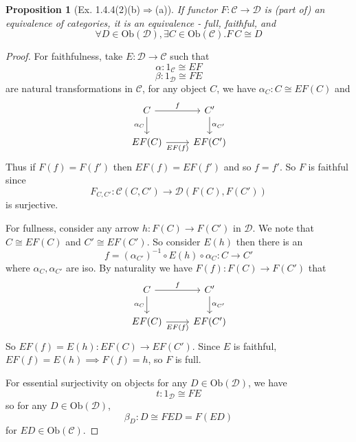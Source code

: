 \documentclass[11pt]{article} %
\newtheorem{proposition}[theorem]{Proposition}
\theoremstyle{definition}
\theoremstyle{definition}
\theoremstyle{definition}
\begin{document}
\begin{proposition}[Ex. 1.4.4(2)(b)$\Rightarrow$(a)]
    If functor $F:\mathcal{C}\rightarrow\mathcal{D}$ is (part of) an equivalence of categories,
    it is an equivalence - full, faithful, and 
    \[\forall D\in\text{Ob}(\mathcal{D}),\exists C\in\text{Ob}(\mathcal{C}). F\ C \cong D\]
\end{proposition}
\begin{proof}
For faithfulness, take $E:\mathcal{D}\rightarrow \mathcal{C}$ such that
\[\alpha : 1_{\mathcal{C}} \cong EF\]
\[\beta : 1_{\mathcal{D}} \cong FE\]
are natural transformations in $\mathcal{C}$, for any object $C$, we have $\alpha_C : C \cong EF(C)$ and
\[\begin{tikzcd}
	C & {C'} \\
	{EF(C)} & {EF(C')}
	\arrow["f", from=1-1, to=1-2]
	\arrow["{\alpha_C}"', from=1-1, to=2-1]
	\arrow["{EF(f)}"', from=2-1, to=2-2]
	\arrow["{\alpha_{C'}}", from=1-2, to=2-2]
\end{tikzcd}\]
Thus if $F(f)=F(f')$ then $EF(f)=EF(f')$ and so $f=f'$. So $F$ is faithful since
\[F_{C,C'}:\mathcal{C}(C,C')\rightarrow \mathcal{D}(F(C),F(C'))\]
is surjective.

For fullness, consider any arrow $h:F(C) \rightarrow F(C')$ in $\mathcal{D}$. 
We note that $C\cong EF(C)$ and $C'\cong EF(C')$. So consider $E(h)$ then there is an
\[f = (\alpha_{C'})^{-1} \circ E(h) \circ \alpha_C : C\rightarrow C'\]
where $\alpha_C,\alpha_{C'}$ are iso. By naturality we have $F(f):F(C)\rightarrow F(C')$ that
\[\begin{tikzcd}
	C & {C'} \\
	{EF(C)} & {EF(C')}
	\arrow["f", from=1-1, to=1-2]
	\arrow["{\alpha_C}"', from=1-1, to=2-1]
	\arrow["{EF(f)}"', from=2-1, to=2-2]
	\arrow["{\alpha_{C'}}", from=1-2, to=2-2]
\end{tikzcd}\]
So $EF(f) = E(h) : EF(C) \rightarrow EF(C')$. Since $E$ is faithful, $EF(f)=E(h)\implies F(f) = h$, so $F$ is full.

For essential surjectivity on objects for any $D\in\text{Ob}(\mathcal{D})$, we have
\[t:1_{\mathcal{D}}\cong FE\]
so for any $D\in\text{Ob}(\mathcal{D})$,
\[\beta_D : D \cong FED = F(ED)\]
for $ED\in \text{Ob}(\mathcal{C})$.
\end{proof}
\end{document}
